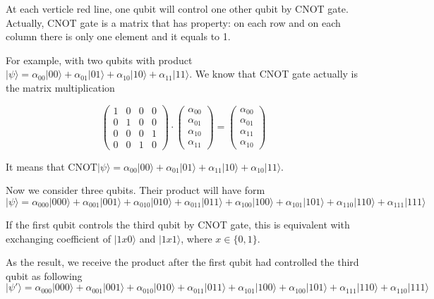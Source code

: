 \documentclass{article}
\begin{document}
At each verticle red line, one qubit will control one other qubit by CNOT gate. Actually, CNOT gate is a matrix that has property: on each row and on each column there is only one element and it equals to 1.

For example, with two qubits with product $\lvert \psi \rangle = \alpha_{00} \lvert 00 \rangle + \alpha_{01} \lvert 01 \rangle + \alpha_{10} \lvert 10 \rangle + \alpha_{11} \lvert 11 \rangle$. We know that CNOT gate actually is the matrix multiplication

\begin{equation}
    \begin{pmatrix}
        1 & 0 & 0 & 0 \\ 0 & 1 & 0 & 0 \\ 0 & 0 & 0 & 1 \\ 0 & 0 & 1 & 0
    \end{pmatrix} \cdot \begin{pmatrix}
        \alpha_{00} \\ \alpha_{01} \\ \alpha_{10} \\ \alpha_{11}
    \end{pmatrix} = \begin{pmatrix}
        \alpha_{00} \\ \alpha_{01} \\ \alpha_{11} \\ \alpha_{10}
    \end{pmatrix}
\end{equation}

It means that $\text{CNOT} \lvert \psi \rangle = \alpha_{00} \lvert 00 \rangle + \alpha_{01} \lvert 01 \rangle + \alpha_{11} \lvert 10 \rangle + \alpha_{10} \lvert 11 \rangle$.

Now we consider three qubits. Their product will have form \[ \lvert \psi \rangle = \alpha_{000} \lvert 000 \rangle + \alpha_{001} \lvert 001 \rangle + \alpha_{010} \lvert 010 \rangle + \alpha_{011} \lvert 011 \rangle + \alpha_{100} \lvert 100 \rangle + \alpha_{101} \lvert 101 \rangle + \alpha_{110} \lvert 110 \rangle + \alpha_{111} \lvert 111 \rangle \]

If the first qubit controls the third qubit by CNOT gate, this is equivalent with exchanging coefficient of $\lvert 1x0 \rangle$ and $\lvert 1x1 \rangle$, where $x \in \{0, 1\}$.

As the result, we receive the product after the first qubit had controlled the third qubit as following \[ \lvert \psi' \rangle = \alpha_{000} \lvert 000 \rangle + \alpha_{001} \lvert 001 \rangle + \alpha_{010} \lvert 010 \rangle + \alpha_{011} \lvert 011 \rangle + \alpha_{101} \lvert 100 \rangle + \alpha_{100} \lvert 101 \rangle + \alpha_{111} \lvert 110 \rangle + \alpha_{110} \lvert 111 \rangle \]
\end{document}
